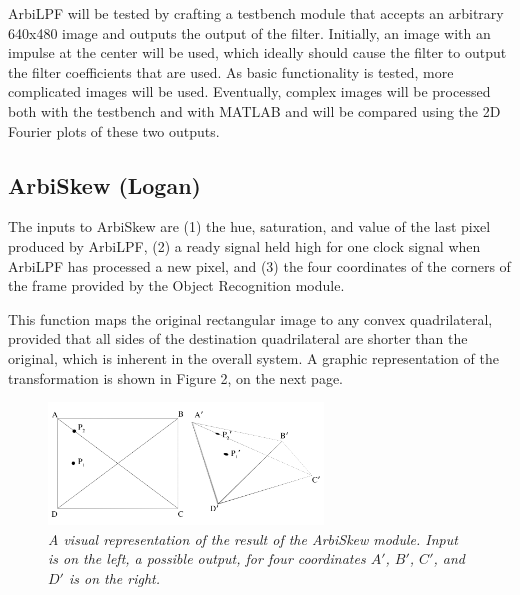 \documentclass[10pt]{article}
\begin{document}
ArbiLPF will be tested by crafting a testbench module that accepts an arbitrary 640x480 image and outputs the output of the filter. Initially, an image with an impulse at the center will be used, which ideally should cause the filter to output the filter coefficients that are used. As basic functionality is tested, more complicated images will be used. Eventually, complex images will be processed both with the testbench and with MATLAB and will be compared using the 2D Fourier plots of these two outputs.

\subsection{ArbiSkew (Logan)}
The inputs to ArbiSkew are (1) the hue, saturation, and value of the last pixel produced by ArbiLPF, (2) a ready signal held high for one clock signal when ArbiLPF has processed a new pixel, and (3) the four coordinates of the corners of the frame provided by the Object Recognition module.

This function maps the original rectangular image to any convex quadrilateral, provided that all sides of the destination quadrilateral are shorter than the original, which is inherent in the overall system. A graphic representation of the transformation is shown in Figure 2, on the next page.

\begin{figure}[h!]
\centering
\includegraphics[width=0.65\textwidth]{arbiskew_graphic.png}
\caption{\emph{A visual representation of the result of the ArbiSkew module. Input is on the left, a possible output, for four coordinates $A\prime$, $B\prime$, $C\prime$, and $D\prime$ is on the right.}}
\end{figure}
\end{document}
